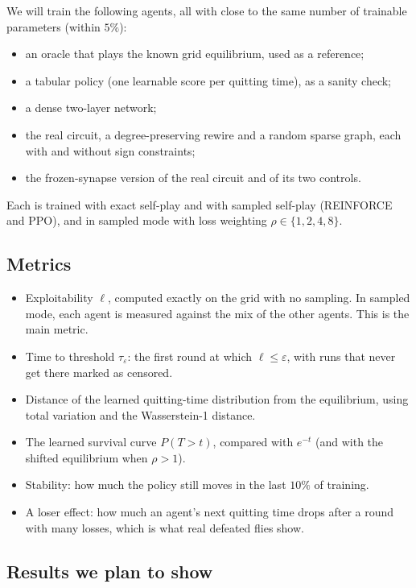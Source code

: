 \documentclass{article}
\newcommand{\expl}{\ell}
\begin{document}
We will train the following agents, all with close to the same number of trainable parameters (within $5\%$):
\begin{itemize}
  \item an oracle that plays the known grid equilibrium, used as a reference;
  \item a tabular policy (one learnable score per quitting time), as a sanity check;
  \item a dense two-layer network;
  \item the real circuit, a degree-preserving rewire and a random sparse graph, each with and without sign constraints;
  \item the frozen-synapse version of the real circuit and of its two controls.
\end{itemize}
Each is trained with exact self-play and with sampled self-play (REINFORCE and PPO), and in sampled mode with loss weighting $\rho \in \{1,2,4,8\}$.

\subsection{Metrics}

\begin{itemize}
  \item Exploitability $\expl$, computed exactly on the grid with no sampling. In sampled mode, each agent is measured against the mix of the other agents. This is the main metric.
  \item Time to threshold $\tau_\varepsilon$: the first round at which $\expl \le \varepsilon$, with runs that never get there marked as censored.
  \item Distance of the learned quitting-time distribution from the equilibrium, using total variation and the Wasserstein-1 distance.
  \item The learned survival curve $P(T > t)$, compared with $e^{-t}$ (and with the shifted equilibrium when $\rho > 1$).
  \item Stability: how much the policy still moves in the last $10\%$ of training.
  \item A loser effect: how much an agent's next quitting time drops after a round with many losses, which is what real defeated flies show.
\end{itemize}

\subsection{Results we plan to show}
\end{document}

